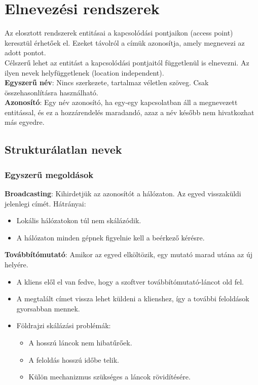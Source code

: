 \documentclass[12pt]{article}
\begin{document}
	\section{Elnevezési rendszerek}
	
	Az elosztott rendszerek entitásai a kapcsolódási pontjaikon (access point) keresztül érhetőek el. Ezeket távolról
	a címük azonosítja, amely megnevezi az adott pontot.\\
	
	\noindent Célszerű lehet az entitást a kapcsolódási pontjaitól függetlenül is elnevezni. Az ilyen nevek helyfüggetlenek (location
	independent).\\
	
	\noindent \textbf{Egyszerű név}: Nincs szerkezete, tartalmaz véletlen szöveg. Csak összehasonlításra használható.\\
	
	\noindent \textbf{Azonosító}: Egy név azonosító, ha egy-egy kapcsolatban áll a megnevezett entitással, és ez
	a hozzárendelés maradandó, azaz a név később nem hivatkozhat más egyedre.
	
	\subsection{Strukturálatlan nevek}
	
	\subsubsection{Egyszerű megoldások}
	
	\noindent \textbf{Broadcasting}: Kihirdetjük az azonosítót a hálózaton. Az egyed visszaküldi jelenlegi címét.
	Hátrányai:
	\begin{itemize}
		\item	Lokális hálózatokon túl nem skálázódik.
		
		\item	A hálózaton minden gépnek figyelnie kell a beérkező kérésre.
	\end{itemize}
	
	\noindent \textbf{Továbbítómutató}: Amikor az egyed elköltözik, egy mutató marad utána az új helyére.
	\begin{itemize}
		\item	A kliens elől el van fedve, hogy a szoftver továbbítómutató-láncot old fel.
		\item	A megtalált címet vissza lehet küldeni a klienshez, így a további feloldások gyorsabban mennek.
		\item	Földrajzi skálázási problémák:
		\begin{itemize}
			\item	A hosszú láncok nem hibatűrőek.
			\item	A feloldás hosszú időbe telik.
			\item	Külön mechanizmus szükséges a láncok rövidítésére.
		\end{itemize}
	\end{itemize}
	
\end{document}
